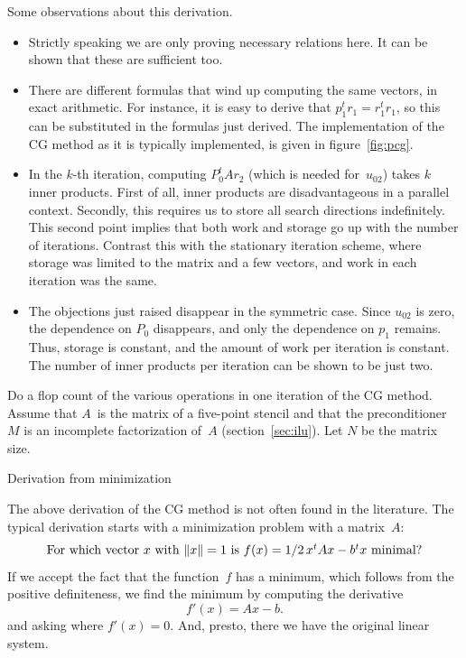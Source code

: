 Some observations about this derivation.
\begin{itemize}
\item Strictly speaking we are only proving necessary
  relations here. It can be shown that these are sufficient too.
\item There are different formulas that wind up computing the same
  vectors, in exact arithmetic. For instance, it is easy to derive
  that $p_1^tr_1=r_1^tr_1$, so this can be substituted in the formulas
  just derived. The implementation of the \ac{CG} method as it is
  typically implemented, is given in figure~\ref{fig:pcg}.
\item In the $k$-th iteration, computing $P_0^tAr_2$ (which is needed
  for~$u_{02}$) takes $k$ inner products. First of all, inner products
  are disadvantageous in a parallel context. Secondly, this requires
  us to store all search directions indefinitely. This second point
  implies that both work
  and storage go up with the number of iterations. Contrast this with
  the stationary iteration scheme, where storage was limited to the
  matrix and a few vectors, and work in each iteration was the same.
\item The objections just raised disappear in the symmetric
  case. Since $u_{02}$ is zero, the dependence on $P_0$ disappears,
  and only the dependence on $p_1$ remains. Thus, storage is constant,
  and the amount of work per iteration is constant. The number of
  inner products per iteration can be shown to be just two.
\end{itemize}



\begin{exercise}
  Do a flop count of the various operations in one iteration of the
  \ac{CG} method. Assume that $A$~is the matrix of a five-point
  stencil and that the preconditioner $M$ is an incomplete
  factorization of~$A$ (section~\ref{sec:ilu}). Let $N$ be the matrix size.
\end{exercise}


 {Derivation from minimization}

The above derivation of the \ac{CG} method is not often found in the
literature. The typical derivation starts with a minimization problem
with a  matrix~$A$:
\begin{equation}
  \hbox{For which vector $x$ with $\|x\|=1$ is $f(x)=1/2\, x^tAx-b^tx$ minimal?}
\end{equation}
If we accept the fact that the function~$f$ has a minimum, which
follows from the positive definiteness, we find the minimum by
computing the derivative
\[ f'(x) = Ax-b. \]
and asking where $f'(x)=0$. And, presto, there we have the original
linear system.

